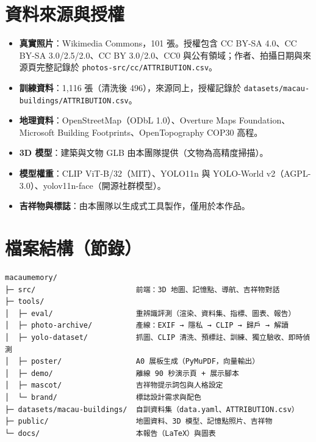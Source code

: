 \documentclass[11pt,a4paper,fontset=windows]{ctexart}
\begin{document}
\section{資料來源與授權}
\begin{itemize}[leftmargin=1.4em,itemsep=2pt]
  \item \textbf{真實照片}：Wikimedia Commons，101 張。授權包含 CC BY-SA 4.0、CC BY-SA 3.0/2.5/2.0、CC BY 3.0/2.0、CC0 與公有領域；作者、拍攝日期與來源頁完整記錄於 \texttt{photos-src/cc/ATTRIBUTION.csv}。
  \item \textbf{訓練資料}：1,116 張（清洗後 496），來源同上，授權記錄於 \texttt{datasets/macau-buildings/ATTRIBUTION.csv}。
  \item \textbf{地理資料}：OpenStreetMap（ODbL 1.0）、Overture Maps Foundation、Microsoft Building Footprints、OpenTopography COP30 高程。
  \item \textbf{3D 模型}：建築與文物 GLB 由本團隊提供（文物為高精度掃描）。
  \item \textbf{模型權重}：CLIP ViT-B/32（MIT）、YOLO11n 與 YOLO-World v2（AGPL-3.0）、yolov11n-face（開源社群模型）。
  \item \textbf{吉祥物與標誌}：由本團隊以生成式工具製作，僅用於本作品。
\end{itemize}

\section{檔案結構（節錄）}
\begin{verbatim}
macaumemory/
├─ src/                       前端：3D 地圖、記憶點、導航、吉祥物對話
├─ tools/
│  ├─ eval/                   重辨識評測（渲染、資料集、指標、圖表、報告）
│  ├─ photo-archive/          產線：EXIF → 隱私 → CLIP → 歸戶 → 解讀
│  ├─ yolo-dataset/           抓圖、CLIP 清洗、預標註、訓練、獨立驗收、即時偵測
│  ├─ poster/                 A0 展板生成（PyMuPDF，向量輸出）
│  ├─ demo/                   離線 90 秒演示頁 + 展示腳本
│  ├─ mascot/                 吉祥物提示詞包與人格設定
│  └─ brand/                  標誌設計需求與配色
├─ datasets/macau-buildings/  自訓資料集（data.yaml、ATTRIBUTION.csv）
├─ public/                    地圖資料、3D 模型、記憶點照片、吉祥物
└─ docs/                      本報告（LaTeX）與圖表
\end{verbatim}

\end{document}

